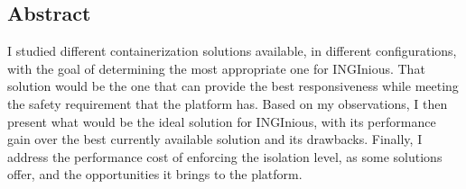 \newpage
\begin{center}
  \section*{Abstract}
\end{center}

I studied different containerization solutions available, in different configurations, with the goal of determining the most appropriate one for INGInious.  That solution would be the one that can provide the best responsiveness while meeting the safety requirement that the platform has.  Based on my observations, I then present what would be the ideal solution for INGInious, with its performance gain over the best currently available solution and its drawbacks.  Finally, I address the performance cost of enforcing the isolation level, as some solutions offer, and the opportunities it brings to the platform.
